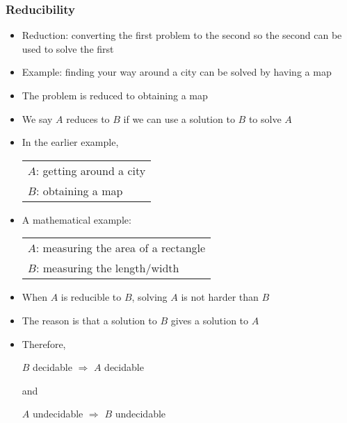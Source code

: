 \begin{frame}[allowframebreaks] \frametitle{Reducibility}
  \begin{itemize}
  \item Reduction: converting the first problem to the
    second so the second can be used to solve the first
  \item Example: finding your way around a city can be solved
    by having a map
  \item [] The problem is reduced to obtaining a map
  \item We say $A$ reduces to $B$ if we can use a solution to
    $B$ to solve $A$
  \item In the earlier example,
    \begin{center}
      \begin{tabular}{l}
        $A$: getting around a city\\
        $B$: obtaining a map
      \end{tabular}
    \end{center}      
    \item A mathematical example:
      \begin{center}
        \begin{tabular}{l}
          $A$: measuring the area of a rectangle\\
          $B$: measuring the length/width
        \end{tabular}
      \end{center}
    \item When $A$ is reducible to $B$, solving $A$ is
      not harder than $B$
    \item The reason is that a solution to $B$ gives
      a solution to $A$
    \item Therefore,
      \begin{center}
        $B$ decidable $\Rightarrow$ $A$ decidable
      \end{center}
      and
      \begin{center}
        $A$ undecidable $\Rightarrow$ $B$ undecidable
      \end{center}
\end{itemize}\end{frame} 

